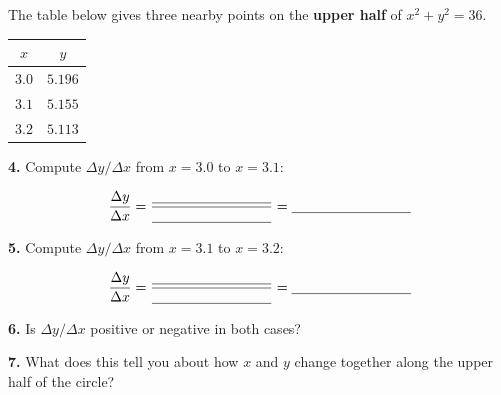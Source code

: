 \documentclass[10pt]{article}
\begin{document}
\begin{tcolorbox}[colback=white, colframe=black!40,
    title=\textbf{Part 2 --- Analyzing Co-variation on $x^2 + y^2 = 36$},
    fonttitle=\bfseries, arc=2mm, left=3mm, right=3mm, top=2mm, bottom=2mm]

The table below gives three nearby points on the \textbf{upper half} of $x^2 + y^2 = 36$.

\vspace{6pt}
\renewcommand{\arraystretch}{1.4}
\begin{tabular}{c|c}
$x$ & $y$ \\\hline
$3.0$ & $5.196$ \\
$3.1$ & $5.155$ \\
$3.2$ & $5.113$ \\
\end{tabular}

\vspace{0.12in}
\textbf{4.} Compute $\Delta y/\Delta x$ from $x = 3.0$ to $x = 3.1$:

\[
\frac{\Delta y}{\Delta x} = \frac{\blank{3cm}}{\blank{3cm}} = \blank{3cm}
\]

\textbf{5.} Compute $\Delta y/\Delta x$ from $x = 3.1$ to $x = 3.2$:

\[
\frac{\Delta y}{\Delta x} = \frac{\blank{3cm}}{\blank{3cm}} = \blank{3cm}
\]

\textbf{6.} Is $\Delta y/\Delta x$ positive or negative in both cases? \blank{3cm}

\textbf{7.} What does this tell you about how $x$ and $y$ change together along the upper half of the circle?

\writeline

\end{tcolorbox}

\vspace{0.1in}
\end{document}
